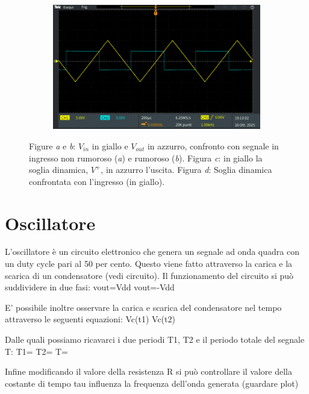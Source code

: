 \documentclass[a4paper,12pt]{article}
\begin{document}
\begin{figure}[h]
\begin{subfigure}{0.49\linewidth}
        \caption{}
    \end{subfigure}
    \begin{subfigure}{0.49\linewidth}
        \includegraphics[width = \linewidth]{immagini/schmitt/schmitt_vin_v+.png}
        \caption{}
    \end{subfigure}
    \caption{Figure \textit{a} e \textit{b}: $V_{in}$ in giallo e $V_{out}$ in azzurro, confronto con segnale in ingresso non rumoroso (\textit{a}) e rumoroso (\textit{b}).
                Figura \textit{c}: in giallo la soglia dinamica, $V^+$, in azzurro l'uscita.
                Figura \textit{d}: Soglia dinamica confrontata con l'ingresso (in giallo).}
    \label{fig:schmitt_oscilloscopio}
\end{figure}


\section*{Oscillatore}
L'oscillatore è un circuito elettronico che genera un segnale ad onda quadra con un duty cycle pari al 50 per cento. Questo viene fatto attraverso la carica e la scarica di un condensatore (vedi circuito).
Il funzionamento del circuito si può suddividere in due fasi:
vout=Vdd
vout=-Vdd

E' possibile inoltre osservare la carica e scarica del condensatore nel tempo attraverso le seguenti equazioni:
Vc(t1)
Vc(t2)

Dalle quali possiamo ricavarci i due periodi T1, T2 e il periodo totale del segnale T:
T1=
T2=
T=

Infine modificando il valore della resistenza R si può controllare il valore della costante di tempo tau influenza la frequenza dell'onda generata (guardare plot) 
\end{document}
